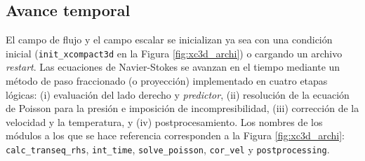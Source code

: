 \subsection{Avance temporal} \label{sec:time-ava}

El campo de flujo y el campo escalar se inicializan ya sea con una condición inicial (\texttt{init\_xcompact3d} en la Figura \ref{fig:xc3d_archi}) o cargando un archivo \textit{restart}. Las ecuaciones de Navier-Stokes se avanzan en el tiempo mediante un método de paso fraccionado (o proyección) implementado en cuatro etapas lógicas: (i) evaluación del lado derecho y \textit{predictor}, (ii) resolución de la ecuación de Poisson para la presión  e imposición de incompresibilidad, (iii) corrección de la velocidad y la temperatura, y (iv) postprocesamiento. Los nombres de los módulos a los que se hace referencia corresponden a la Figura \ref{fig:xc3d_archi}: \texttt{calc\_transeq\_rhs}, \texttt{int\_time}, \texttt{solve\_poisson}, \texttt{cor\_vel} y \texttt{postprocessing}.



